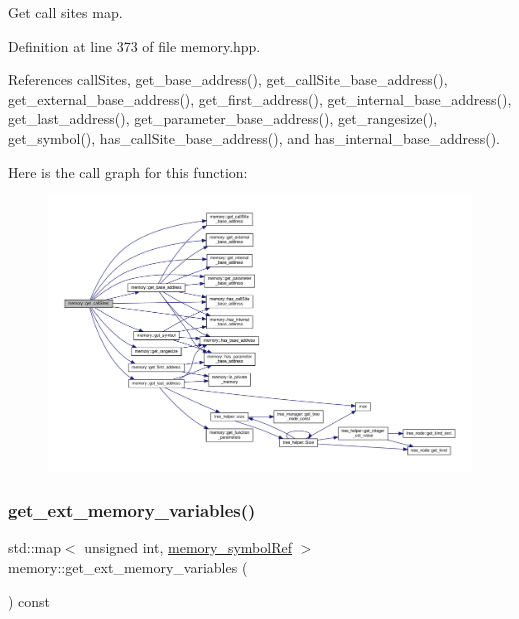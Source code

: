 Get call sites map. 



Definition at line 373 of file memory.\+hpp.



References call\+Sites, get\+\_\+base\+\_\+address(), get\+\_\+call\+Site\+\_\+base\+\_\+address(), get\+\_\+external\+\_\+base\+\_\+address(), get\+\_\+first\+\_\+address(), get\+\_\+internal\+\_\+base\+\_\+address(), get\+\_\+last\+\_\+address(), get\+\_\+parameter\+\_\+base\+\_\+address(), get\+\_\+rangesize(), get\+\_\+symbol(), has\+\_\+call\+Site\+\_\+base\+\_\+address(), and has\+\_\+internal\+\_\+base\+\_\+address().

Here is the call graph for this function\+:
\nopagebreak
\begin{figure}[H]
\begin{center}
\leavevmode
\includegraphics[width=350pt]{d8/d99/classmemory_adcab40db7617504ad89b0d11d53c8965_cgraph}
\end{center}
\end{figure}
\mbox{\label{classmemory_a59407bf67cc11931fc505d7fc9e86898}} 
\subsubsection{\texorpdfstring{get\+\_\+ext\+\_\+memory\+\_\+variables()}{get\_ext\_memory\_variables()}}
{\footnotesize\ttfamily std\+::map$<$ unsigned int, \hyperlink{memory__symbol_8hpp_af3608dbc27177447c2d777fa712cc82a}{memory\+\_\+symbol\+Ref} $>$ memory\+::get\+\_\+ext\+\_\+memory\+\_\+variables (\begin{DoxyParamCaption}{ }\end{DoxyParamCaption}) const}



